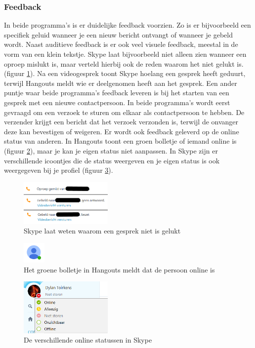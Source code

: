\documentclass[11pt]{article}
\begin{document}
\subsubsection{Feedback}
In beide programma's is er duidelijke feedback voorzien. Zo is er bijvoorbeeld een specifiek geluid wanneer je een nieuw bericht ontvangt of wanneer je gebeld wordt. Naast auditieve feedback is er ook veel visuele feedback, meestal in de vorm van een klein tekstje. Skype laat bijvoorbeeld niet alleen zien wanneer een oproep mislukt is, maar verteld hierbij ook de reden waarom het niet gelukt is. (figuur \ref{fig:SFeedbackGesprek}). Na een videogesprek toont Skype hoelang een gesprek heeft geduurt, terwijl Hangouts meldt wie er deelgenomen heeft aan het gesprek. Een ander puntje waar beide programma's feedback leveren is bij het starten van een gesprek met een nieuwe contactpersoon. In beide programma's wordt eerst gevraagd om een verzoek te sturen om elkaar als contactpersoon te hebben. De verzender krijgt een bericht dat het verzoek verzonden is, terwijl de onvanger deze kan bevestigen of weigeren. Er wordt ook feedback geleverd op de online status van anderen. In Hangouts toont een groen bolletje of iemand online is (figuur \ref{fig:HOnline}), maar je kan je eigen status niet aanpassen. In Skype zijn er verschillende icoontjes die de status weergeven en je eigen status is ook weergegeven bij je profiel (figuur \ref{fig:SStatus}).
\begin{figure}
	\centering
	\includegraphics[width=0.4\textwidth]{Dylan_SFeedbackGesprek.png}
	\caption{Skype laat weten waarom een gesprek niet is gelukt}
	\label{fig:SFeedbackGesprek}
\end{figure}
\begin{figure}
	\centering
	\includegraphics[width=0.1\textwidth]{Dylan_HOnline.png}
	\caption{Het groene bolletje in Hangouts meldt dat de persoon online is}
	\label{fig:HOnline}
\end{figure}
\begin{figure}
	\centering
	\includegraphics[width=0.4\textwidth]{Dylan_SStatus.png}
	\caption{De verschillende online statussen in Skype}
	\label{fig:SStatus}
\end{figure}
\end{document}
